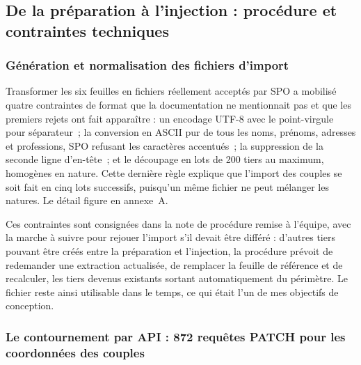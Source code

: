 \hypertarget{de-la-pruxe9paration-uxe0-linjection-procuxe9dure-et-contraintes-techniques}{%
\subsection{De la préparation à l'injection : procédure et contraintes techniques}\label{de-la-pruxe9paration-uxe0-linjection-procuxe9dure-et-contraintes-techniques}}

\hypertarget{guxe9nuxe9ration-et-normalisation-des-fichiers-dimport}{%
\subsubsection{Génération et normalisation des fichiers d'import}\label{guxe9nuxe9ration-et-normalisation-des-fichiers-dimport}}

Transformer les six feuilles en fichiers réellement acceptés par SPO a mobilisé quatre
contraintes de format que la documentation ne mentionnait pas et que les premiers rejets ont
fait apparaître : un encodage UTF-8 avec le point-virgule pour séparateur~; la conversion en
ASCII pur de tous les noms, prénoms, adresses et professions, SPO refusant les caractères
accentués~; la suppression de la seconde ligne d'en-tête~; et le découpage en lots de 200
tiers au maximum, homogènes en nature. Cette dernière règle explique que l'import des couples
se soit fait en cinq lots successifs, puisqu'un même fichier ne peut mélanger les natures. Le
détail figure en annexe~A.

Ces contraintes sont consignées dans la note de procédure remise à l'équipe, avec la marche à
suivre pour rejouer l'import s'il devait être différé : d'autres tiers pouvant être créés
entre la préparation et l'injection, la procédure prévoit de redemander une extraction
actualisée, de remplacer la feuille de référence et de recalculer, les tiers devenus existants
sortant automatiquement du périmètre. Le fichier reste ainsi utilisable dans le temps, ce qui
était l'un de mes objectifs de conception.

\hypertarget{le-contournement-par-api-872-requuxeates-patch-pour-les-coordonnuxe9es-des-couples}{%
\subsubsection{Le contournement par API : 872 requêtes PATCH pour les coordonnées des couples}\label{le-contournement-par-api-872-requuxeates-patch-pour-les-coordonnuxe9es-des-couples}}

